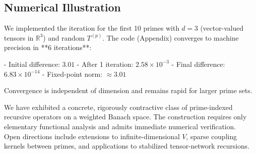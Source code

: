 \documentclass[11pt, a4paper]{article}
\begin{document}
\subsection{Numerical Illustration}

We implemented the iteration for the first 10 primes with \(d=3\) (vector-valued tensors in \(\mathbb{R}^3\)) and random \(T^{(p)}\). The code (Appendix) converges to machine precision in **6 iterations**:

- Initial difference: \(3.01\)
- After 1 iteration: \(2.58 \times 10^{-3}\)
- Final difference: \(6.83 \times 10^{-14}\)
- Fixed-point norm: \(\approx 3.01\)

Convergence is independent of dimension and remains rapid for larger prime sets.

We have exhibited a concrete, rigorously contractive class of prime-indexed recursive operators on a weighted Banach space. The construction requires only elementary functional analysis and admits immediate numerical verification. Open directions include extensions to infinite-dimensional \(V\), sparse coupling kernels between primes, and applications to stabilized tensor-network recursions.
\nocite{*}
  
  
\end{document}
